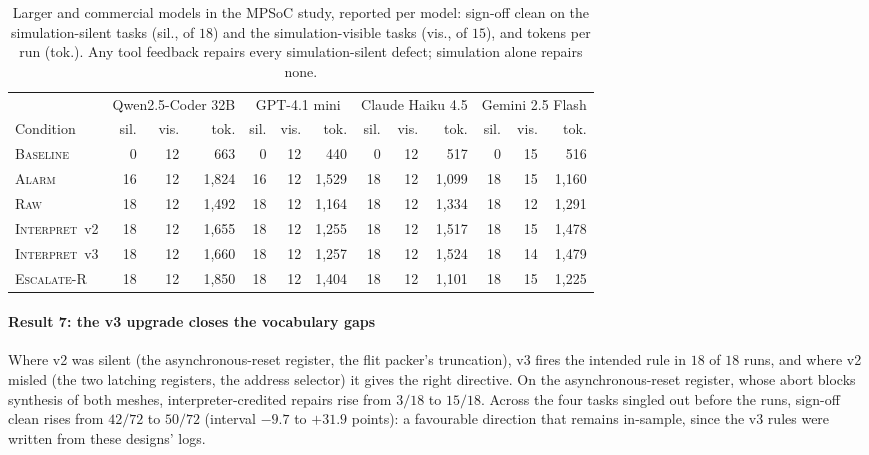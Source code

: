 \documentclass[11pt]{article}
\newcommand{\cname}[1]{\textsc{#1}}
\newcommand{\Base}{\cname{Baseline}}
\newcommand{\Alarm}{\cname{Alarm}}
\newcommand{\Raw}{\cname{Raw}}
\newcommand{\Interp}{\cname{Interpret}}
\newcommand{\EscR}{\cname{Escalate-R}}
\newcommand{\Itwo}{\Interp~v2}
\newcommand{\Ithree}{\Interp~v3}
\begin{document}
\begin{table}[!htbp]
\centering
\footnotesize
\caption{Larger and commercial models in the MPSoC study, reported per model:
sign-off clean on the simulation-silent tasks (sil., of $18$) and the
simulation-visible tasks (vis., of $15$), and tokens per run (tok.). Any tool
feedback repairs every simulation-silent defect; simulation alone repairs none.}
\label{tab:ladder}
\setlength{\tabcolsep}{3.2pt}
\begin{tabular}{@{}l rrr@{\hspace{11pt}}rrr@{\hspace{11pt}}rrr@{\hspace{11pt}}rrr@{}}
\toprule
 & \multicolumn{3}{c}{Qwen2.5-Coder 32B} & \multicolumn{3}{c}{GPT-4.1 mini} & \multicolumn{3}{c}{Claude Haiku 4.5} & \multicolumn{3}{c}{Gemini 2.5 Flash} \\
\cmidrule(lr){2-4}\cmidrule(lr){5-7}\cmidrule(lr){8-10}\cmidrule(l){11-13}
Condition & sil. & vis. & tok. & sil. & vis. & tok. & sil. & vis. & tok. & sil. & vis. & tok. \\
\midrule
\Base     & 0  & 12 & 663   & 0  & 12 & 440   & 0  & 12 & 517   & 0  & 15 & 516 \\
\Alarm    & 16 & 12 & 1,824 & 16 & 12 & 1,529 & 18 & 12 & 1,099 & 18 & 15 & 1,160 \\
\Raw      & 18 & 12 & 1,492 & 18 & 12 & 1,164 & 18 & 12 & 1,334 & 18 & 12 & 1,291 \\
\Itwo     & 18 & 12 & 1,655 & 18 & 12 & 1,255 & 18 & 12 & 1,517 & 18 & 15 & 1,478 \\
\Ithree   & 18 & 12 & 1,660 & 18 & 12 & 1,257 & 18 & 12 & 1,524 & 18 & 14 & 1,479 \\
\EscR     & 18 & 12 & 1,850 & 18 & 12 & 1,404 & 18 & 12 & 1,101 & 18 & 15 & 1,225 \\
\bottomrule
\end{tabular}
\end{table}

\paragraph{Result 7: the v3 upgrade closes the vocabulary gaps} Where v2 was
silent (the asynchronous-reset register, the flit packer's truncation), v3
fires the intended rule in $18$ of $18$ runs, and where v2 misled (the two
latching registers, the address selector) it gives the right directive. On the
asynchronous-reset register, whose abort blocks synthesis of both meshes,
interpreter-credited repairs rise from $3/18$ to $15/18$. Across the four tasks
singled out before the runs, sign-off clean rises from $42/72$ to $50/72$
(interval $-9.7$ to $+31.9$ points): a favourable direction that remains
in-sample, since the v3 rules were written from these designs' logs.
\end{document}
